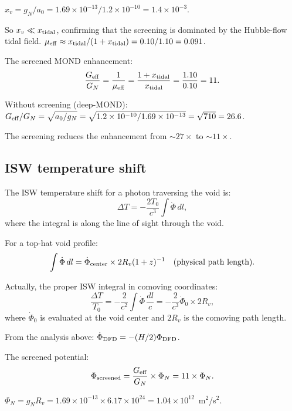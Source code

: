 \documentclass[11pt]{article}
\newcommand{\ee}[1]{\times 10^{#1}}
\newcommand{\Geff}{G_{\rm eff}}
\newcommand{\aM}{a_0}
\begin{document}
$x_v = g_N/\aM = 1.69\ee{-13}/1.2\ee{-10} = 1.4\ee{-3}$.

So $x_v \ll x_{\rm tidal}$, confirming that the screening is dominated
by the Hubble-flow tidal field. $\mu_{\rm eff} \approx
x_{\rm tidal}/(1+x_{\rm tidal}) = 0.10/1.10 = 0.091$.

The screened MOND enhancement:
\begin{equation}
\frac{\Geff}{G_N} = \frac{1}{\mu_{\rm eff}}
= \frac{1+x_{\rm tidal}}{x_{\rm tidal}}
= \frac{1.10}{0.10} = 11.
\end{equation}

Without screening (deep-MOND): $\Geff/G_N = \sqrt{\aM/g_N}
= \sqrt{1.2\ee{-10}/1.69\ee{-13}} = \sqrt{710} = 26.6$.

The screening reduces the enhancement from $\sim 27\times$ to
$\sim 11\times$.

\subsection{ISW temperature shift}

The ISW temperature shift for a photon traversing the void is:
\begin{equation}
\Delta T = -\frac{2T_0}{c^3}\int\dot\Phi\,dl,
\end{equation}
where the integral is along the line of sight through the void.

For a top-hat void profile:
\begin{equation}
\int\dot\Phi\,dl = \dot\Phi_{\rm center}\times 2R_v(1+z)^{-1}
\quad\text{(physical path length)}.
\end{equation}

Actually, the proper ISW integral in comoving coordinates:
\begin{equation}
\frac{\Delta T}{T_0} = -\frac{2}{c^2}\int\dot\Phi\,\frac{dl}{c}
= -\frac{2}{c^3}\dot\Phi_0\times 2R_v,
\end{equation}
where $\dot\Phi_0$ is evaluated at the void center and $2R_v$ is
the comoving path length.

From the analysis above:
$\dot\Phi_{\rm DFD} = -(H/2)\Phi_{\rm DFD}$.

The screened potential:
\begin{equation}
\Phi_{\rm screened} = \frac{\Geff}{G_N}\times\Phi_N
= 11\times\Phi_N.
\end{equation}

$\Phi_N = g_N R_v = 1.69\ee{-13}\times 6.17\ee{24}
= 1.04\ee{12}$~m$^2$/s$^2$.
\end{document}
